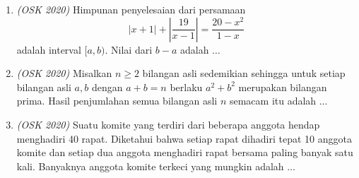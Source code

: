 \begin{enumerate}
	\item \textit{(OSK 2020)} Himpunan penyelesaian dari persamaan $$|x+1|+\left|\dfrac{19}{x-1}\right|=\dfrac{20-x^2}{1-x}$$ adalah interval $[a,b)$. Nilai dari $b-a$ adalah $\dots$
	
	\item \textit{(OSK 2020)} Misalkan $n \geq 2$ bilangan asli sedemikian sehingga untuk setiap bilangan asli $a,b$ dengan  $a+b = n$ berlaku $a^2+b^2$ merupakan bilangan prima. Hasil penjumlahan semua bilangan asli $n$ semacam itu adalah $\dots$
	
	\item \textit{(OSK 2020)} Suatu komite yang terdiri dari beberapa anggota hendap menghadiri 40 rapat. Diketahui bahwa setiap rapat dihadiri tepat 10 anggota komite dan setiap dua anggota menghadiri rapat bersama paling banyak satu kali. Banyaknya anggota komite terkeci yang mungkin adalah $\dots$
\end{enumerate}


